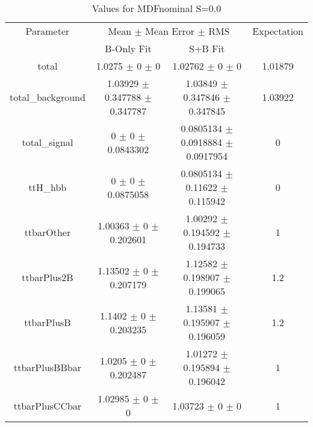 \begin{table}
\centering
\caption{Values for MDFnominal S=0.0}
\begin{tabular}{cccc}
\toprule
Parameter & \multicolumn{2}{c}{Mean $\pm$ Mean Error $\pm$ RMS} & Expectation\\
 & B-Only Fit & S+B Fit & \\
\midrule
total & \num{1.0275} $\pm$ \num{0} $\pm$ \num{0} & \num{1.02762} $\pm$ \num{0} $\pm$ \num{0} & \num{1.01879}\\
total\_background & \num{1.03929} $\pm$ \num{0.347788} $\pm$ \num{0.347787} & \num{1.03849} $\pm$ \num{0.347846} $\pm$ \num{0.347845} & \num{1.03922}\\
total\_signal & \num{0} $\pm$ \num{0} $\pm$ \num{0.0843302} & \num{0.0805134} $\pm$ \num{0.0918884} $\pm$ \num{0.0917954} & \num{0}\\
ttH\_hbb & \num{0} $\pm$ \num{0} $\pm$ \num{0.0875058} & \num{0.0805134} $\pm$ \num{0.11622} $\pm$ \num{0.115942} & \num{0}\\
ttbarOther & \num{1.00363} $\pm$ \num{0} $\pm$ \num{0.202601} & \num{1.00292} $\pm$ \num{0.194592} $\pm$ \num{0.194733} & \num{1}\\
ttbarPlus2B & \num{1.13502} $\pm$ \num{0} $\pm$ \num{0.207179} & \num{1.12582} $\pm$ \num{0.198907} $\pm$ \num{0.199065} & \num{1.2}\\
ttbarPlusB & \num{1.1402} $\pm$ \num{0} $\pm$ \num{0.203235} & \num{1.13581} $\pm$ \num{0.195907} $\pm$ \num{0.196059} & \num{1.2}\\
ttbarPlusBBbar & \num{1.0205} $\pm$ \num{0} $\pm$ \num{0.202487} & \num{1.01272} $\pm$ \num{0.195894} $\pm$ \num{0.196042} & \num{1}\\
ttbarPlusCCbar & \num{1.02985} $\pm$ \num{0} $\pm$ \num{0} & \num{1.03723} $\pm$ \num{0} $\pm$ \num{0} & \num{1}\\
\bottomrule
\end{tabular}
\end{table}
